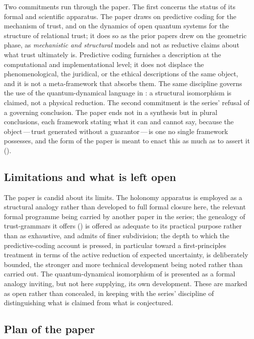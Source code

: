 Two commitments run through the paper. The first concerns the status of its formal and scientific apparatus. The paper draws on predictive coding for the mechanism of trust, and on the dynamics of open quantum systems for the structure of relational trust; it does so as the prior papers drew on the geometric phase, as \emph{mechanistic and structural} models and not as reductive claims about what trust ultimately is. Predictive coding furnishes a description at the computational and implementational level; it does not displace the phenomenological, the juridical, or the ethical descriptions of the same object, and it is not a meta-framework that absorbs them. The same discipline governs the use of the quantum-dynamical language in : a structural isomorphism is claimed, not a physical reduction. The second commitment is the series' refusal of a governing conclusion. The paper ends not in a synthesis but in plural conclusions, each framework stating what it can and cannot say, because the object\,---\,trust generated without a guarantor\,---\,is one no single framework possesses, and the form of the paper is meant to enact this as much as to assert it ().

\subsection*{Limitations and what is left open}

The paper is candid about its limits. The holonomy apparatus is employed as a structural analogy rather than developed to full formal closure here, the relevant formal programme being carried by another paper in the series; the genealogy of trust-grammars it offers () is offered as adequate to its practical purpose rather than as exhaustive, and admits of finer subdivision; the depth to which the predictive-coding account is pressed, in particular toward a first-principles treatment in terms of the active reduction of expected uncertainty, is deliberately bounded, the stronger and more technical development being noted rather than carried out. The quantum-dynamical isomorphism of  is presented as a formal analogy inviting, but not here supplying, its own development. These are marked as open rather than concealed, in keeping with the series' discipline of distinguishing what is claimed from what is conjectured.

\subsection*{Plan of the paper}

